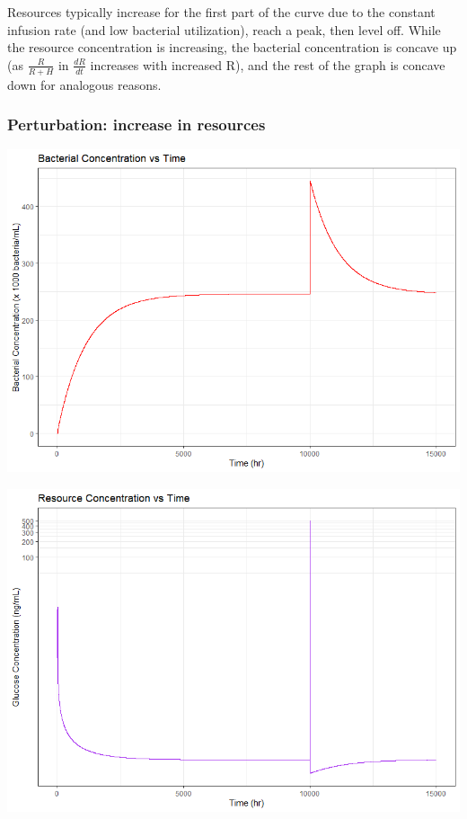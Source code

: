 \documentclass{article}
\begin{document}
Resources typically increase for the first part of the curve due to the constant infusion rate (and low bacterial utilization), reach a peak, then level off. While the resource concentration is increasing, the bacterial concentration is concave up (as $\frac{R}{R+H}$ in $\frac{dR}{dt}$ increases with increased R), and the rest of the graph is concave down for analogous reasons. 

\subsubsection{Perturbation: increase in resources}

\begin{center}
\includegraphics[scale=0.5]{plots/NoPhage_U_perturbed.png}

\includegraphics[scale=0.5]{plots/NoPhage_R_perturbed.png}


\end{center}
\end{document}
